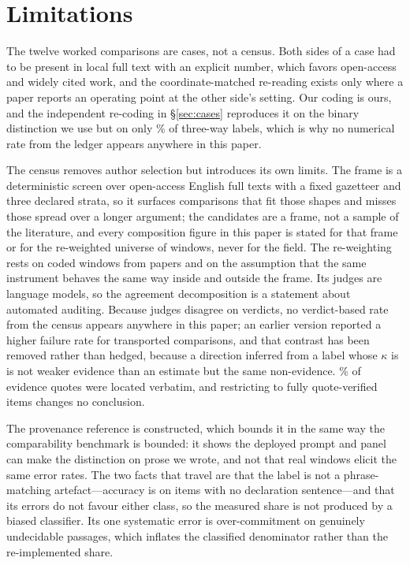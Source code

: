 \documentclass[11pt]{article}
\begin{document}
\section*{Limitations}

The twelve worked comparisons are cases, not a census. Both sides of a case had
to be present in local full text with an explicit number, which favors
open-access and widely cited work, and the coordinate-matched re-reading exists
only where a paper reports an operating point at the other side's setting. Our
coding is ours, and the independent re-coding in \S\ref{sec:cases} reproduces it
on the binary distinction we use but on only \RecThreeWayPct\% of three-way
labels, which is why no numerical rate from the ledger appears anywhere in this
paper.

The census removes author selection but introduces its own limits. The frame is
a deterministic screen over open-access English full texts with a fixed
gazetteer and three declared strata, so it surfaces comparisons that fit those
shapes and misses those spread over a longer argument; the \FrameCandidates{}
candidates are a frame, not a sample of the literature, and every composition
figure in this paper is stated for that frame or for the re-weighted universe of
\RecUniverse{} windows, never for the field. The re-weighting rests on
\RecSampled{} coded windows from \RecPapers{} papers and on the assumption that
the same instrument behaves the same way inside and outside the frame. Its
judges are language models, so the agreement decomposition is a statement about
automated auditing. Because judges disagree on verdicts, no verdict-based rate
from the census appears anywhere in this paper; an earlier version reported a
higher failure rate for transported comparisons, and that contrast has been
removed rather than hedged, because a direction inferred from a label whose
$\kappa$ is \DecVerdictK{} is not weaker evidence than an estimate but the same
non-evidence. \CensusQuoteRate\% of evidence quotes were located verbatim, and
restricting to fully quote-verified items changes no conclusion.

The provenance reference is constructed, which bounds it in the same way the
comparability benchmark is bounded: it shows the deployed prompt and panel can
make the distinction on prose we wrote, and not that real windows elicit the
same error rates. The two facts that travel are that the label is not a
phrase-matching artefact---accuracy is \PvImplicit{} on items with no
declaration sentence---and that its errors do not favour either class, so the
measured share is not produced by a biased classifier. Its one systematic error
is over-commitment on genuinely undecidable passages, which inflates the
classified denominator rather than the re-implemented share.
\end{document}
